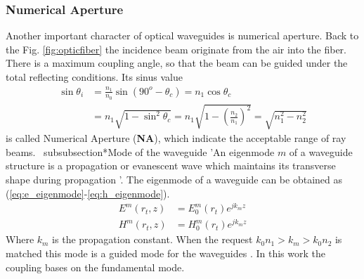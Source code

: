 \subsubsection*{Numerical Aperture }
Another important character of optical waveguides is numerical aperture. Back to the Fig. \ref{fig:opticfiber} the incidence beam originate from the air into the fiber. There is a maximum coupling angle, so that the beam can be guided under the total reflecting conditions. Its sinus value 
\begin{align*}
\sin\theta_{i}&=\frac{n_{1}}{n_{0}}\sin(90^{o}-\theta_{c})=n_{1}\cos\theta_{c} \nonumber\\
&=n_{1}\sqrt{1-\sin^{2}\theta_{c}}=n_{1}\sqrt{1-\left(\frac{n_{2}}{n_{1}}\right)^2}=\sqrt{n^2_{1}-n^2_{2}}
\end{align*}
 is called Numerical Aperture (\textbf{NA}), which indicate the acceptable range of ray beams.
\ subsubsection*{Mode of the waveguide}
'An eigenmode $m$ of a waveguide structure is a propagation or evanescent wave which maintains its transverse shape during propagation '\cite{integrated_optics}. The eigenmode of a waveguide can be obtained as (\ref{eq:e_eigenmode}-\ref{eq:h_eigenmode}).  
\begin{align}
E^{m}(r_{t},z)&=E^{m}_{0}(r_{t})e^{jk_{m}z}
\label{eq:e_eigenmode}\\
H^{m}(r_{t},z)&=H^{m}_{0}(r_{t})e^{jk_{m}z}
\label{eq:h_eigenmode}
\end{align}
Where $k_{m}$ is the propagation constant. When the request  $k_{0}n_{1}>k_{m}>k_{0}n_{2}$ is matched this mode is a guided mode for the waveguides \cite{script_FT_TET}. In this work the coupling bases on the fundamental mode.

